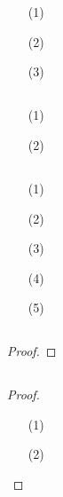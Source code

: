 \documentclass[UTF8]{ctexart}
\begin{document}
\fancyfoot[C]{\thepage}

\section{}
\subsection{}   %
\begin{enumerate}
    \item [(1)]
    \item [(2)]
    \item [(3)]
\end{enumerate}

\subsection{}   %
\begin{enumerate}
    \item [(1)]
    \item [(2)]
\end{enumerate}

\subsection{}   %
\begin{enumerate}
    \item [(1)]
    \item [(2)]
    \item [(3)]
    \item [(4)]
    \item [(5)]
\end{enumerate}

\subsection{}   %
\begin{proof}
    
\end{proof}

\subsection{}   %
\begin{proof}
    \begin{enumerate}
        \item []
        \item [(1)]
        \item [(2)]
    \end{enumerate}
\end{proof}
\end{document}
